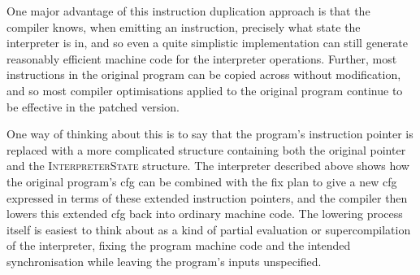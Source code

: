 One major advantage of this instruction duplication approach is that
the compiler knows, when emitting an instruction, precisely what state
the interpreter is in, and so even a quite simplistic implementation
can still generate reasonably efficient machine code for the
interpreter operations.  Further, most instructions in the original
program can be copied across without modification, and so most
compiler optimisations applied to the original program continue to be
effective in the patched version.

One way of thinking about this is to say that the program's
instruction pointer is replaced with a more complicated structure
containing both the original pointer and the \textsc{InterpreterState}
structure.  The interpreter described above shows how the original
program's \gls{cfg} can be combined with the fix plan to give a new
\gls{cfg} expressed in terms of these extended instruction pointers,
and the compiler then lowers this extended \gls{cfg} back into
ordinary machine code.  The lowering process itself is easiest to
think about as a kind of partial evaluation\cite{Jones1993} or
supercompilation\cite{Sorensen2008} of the interpreter, fixing the
program machine code and the intended synchronisation while leaving
the program's inputs unspecified.

